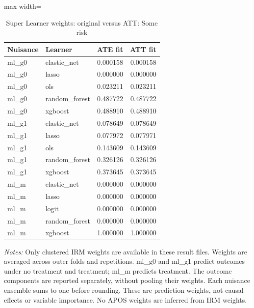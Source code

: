 \begin{table}[htbp]
\centering\scriptsize
\caption{Super Learner weights: original versus ATT: Some risk}
\label{tab:table-ate-att-convex-weights-SomeRiskHome}
\begin{adjustbox}{max width=\linewidth}
\begin{tabular}{llrr}
\toprule
Nuisance & Learner & ATE fit & ATT fit \\
\midrule
ml\_g0 & elastic\_net & 0.000158 & 0.000158 \\
ml\_g0 & lasso & 0.000000 & 0.000000 \\
ml\_g0 & ols & 0.023211 & 0.023211 \\
ml\_g0 & random\_forest & 0.487722 & 0.487722 \\
ml\_g0 & xgboost & 0.488910 & 0.488910 \\
ml\_g1 & elastic\_net & 0.078649 & 0.078649 \\
ml\_g1 & lasso & 0.077972 & 0.077971 \\
ml\_g1 & ols & 0.143609 & 0.143609 \\
ml\_g1 & random\_forest & 0.326126 & 0.326126 \\
ml\_g1 & xgboost & 0.373645 & 0.373645 \\
ml\_m & elastic\_net & 0.000000 & 0.000000 \\
ml\_m & lasso & 0.000000 & 0.000000 \\
ml\_m & logit & 0.000000 & 0.000000 \\
ml\_m & random\_forest & 0.000000 & 0.000000 \\
ml\_m & xgboost & 1.000000 & 1.000000 \\
\bottomrule
\end{tabular}
\end{adjustbox}
\par\vspace{3pt}\begin{minipage}{\linewidth}\scriptsize\textit{Notes:} Only clustered IRM weights are available in these result files. Weights are averaged across outer folds and repetitions. ml\_g0 and ml\_g1 predict outcomes under no treatment and treatment; ml\_m predicts treatment. The outcome components are reported separately, without pooling their weights. Each nuisance ensemble sums to one before rounding. These are prediction weights, not causal effects or variable importance. No APOS weights are inferred from IRM weights.\end{minipage}
\end{table}
